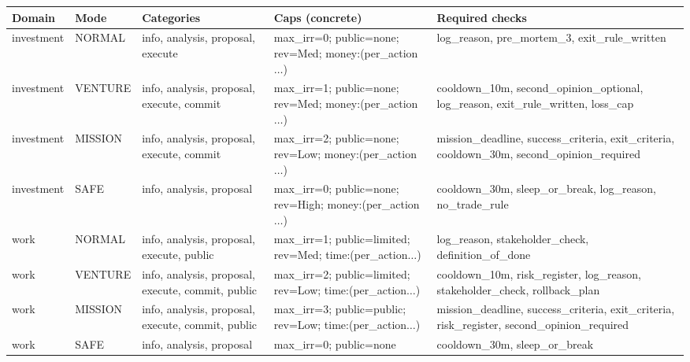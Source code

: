 \begin{table}[ht]
\centering
\scriptsize
\begin{tabularx}{\linewidth}{llXXX}
\toprule
\textbf{Domain} & \textbf{Mode} & \textbf{Categories} & \textbf{Caps (concrete)} & \textbf{Required checks} \\
\midrule

investment & NORMAL
& info, analysis, proposal, execute
& max\_irr=0; public=none; rev=Med; money:(per\_action$\ldots$)
& log\_reason, pre\_mortem\_3, exit\_rule\_written \\

investment & VENTURE
& info, analysis, proposal, execute, commit
& max\_irr=1; public=none; rev=Med; money:(per\_action$\ldots$)
& cooldown\_10m, second\_opinion\_optional, log\_reason,
exit\_rule\_written, loss\_cap \\

investment & MISSION
& info, analysis, proposal, execute, commit
& max\_irr=2; public=none; rev=Low; money:(per\_action$\ldots$)
& mission\_deadline, success\_criteria, exit\_criteria,
cooldown\_30m, second\_opinion\_required \\

investment & SAFE
& info, analysis, proposal
& max\_irr=0; public=none; rev=High; money:(per\_action$\ldots$)
& cooldown\_30m, sleep\_or\_break, log\_reason, no\_trade\_rule \\

\midrule

work & NORMAL
& info, analysis, proposal, execute, public
& max\_irr=1; public=limited; rev=Med; time:(per\_action$\ldots$)
& log\_reason, stakeholder\_check, definition\_of\_done \\

work & VENTURE
& info, analysis, proposal, execute, commit, public
& max\_irr=2; public=limited; rev=Low; time:(per\_action$\ldots$)
& cooldown\_10m, risk\_register, log\_reason, stakeholder\_check,
rollback\_plan \\

work & MISSION
& info, analysis, proposal, execute, commit, public
& max\_irr=3; public=public; rev=Low; time:(per\_action$\ldots$)
& mission\_deadline, success\_criteria, exit\_criteria,
risk\_register, second\_opinion\_required \\

work & SAFE
& info, analysis, proposal
& max\_irr=0; public=none
& cooldown\_30m, sleep\_or\_break \\


\end{tabularx}
\end{table}
